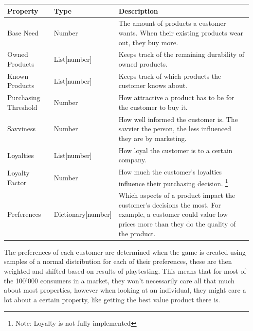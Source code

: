 {\small
	\begin{tabular}{l l p{}} \toprule
		Property             & Type               & Description                                \\ \midrule

		Base Need            & Number             & The amount of products a customer
		wants. When their existing products wear out, they buy more.                           \\

		Owned Products       & List[number]       & Keeps track of the remaining
		durability of owned products.                                                          \\

		Known Products       & List[number]       & Keeps track of which products
		the customer knows about.                                                              \\

		Purchasing Threshold & Number             & How attractive a product has to
		be for the customer to buy it.                                                         \\

		Savviness            & Number             & How well informed the customer is.
		The savvier the person, the less influenced they are by marketing.                     \\

		Loyalties            & List[number]       & How loyal the customer is to a
		certain company.                                                                       \\

		Loyalty Factor       & Number             & How much the customer's loyalties
		influence their purchasing decision. \footnote{Note: Loyalty is not fully implemented} \\

		Preferences          & Dictionary[number] & Which aspects of a product impact
		the customer's decisions the most. For example, a customer could value low
		prices more than they do the quality of the product.                                   \\ \bottomrule
	\end{tabular}}

The preferences of each customer are determined when the game is created using samples of a normal distribution for each
of their preferences, these are then weighted and shifted based on results of playtesting. This means that for most of the 100'000
consumers in a market, they won't necessarily care all that much about most properties, however when looking at an individual, they might care a
lot about a certain property, like getting the best value product there is.

